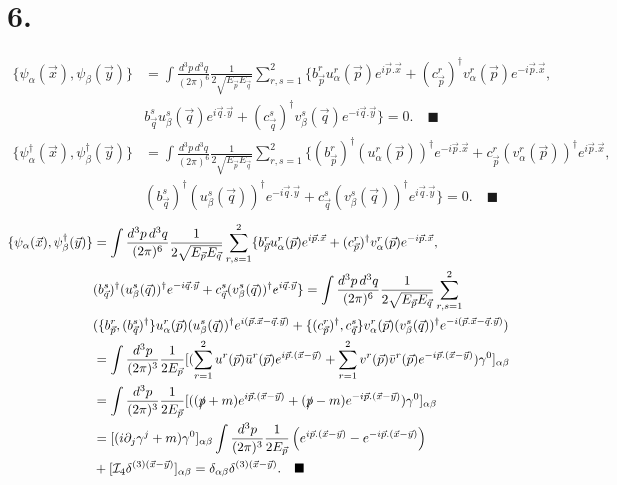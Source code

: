 \documentclass{article}
\newcommand{\pdotx}{\vec{p}.\vec{x}}
\newcommand{\qdoty}{\vec{q}.\vec{y}}
\newcommand{\vecx}{\vec{x}}
\newcommand{\vecy}{\vec{y}}
\newcommand{\vecp}{\vec{p}}
\newcommand{\vecq}{\vec{q}}
\newcommand{\slashp}{\slashed{p}}
\begin{document}
\section*{6.}
\begin{equation}
    \begin{split}
        \{\psi_\alpha(\vecx), \psi_\beta(\vecy) \}&=\int \frac{d^3p\,d^3q}{(2\pi)^6}\frac{1}{2\sqrt{E_{\vecp}E_{\vecq}}}\sum_{r,s=1}^2 \{ b^r_{\vecp}u_\alpha^r(\vecp)e^{i\vecp.\vecx}+(c^r_{\vecp})^\dagger v_\alpha^r(\vecp)e^{-i\vecp.\vecx},\\ & b^s_{\vecq} u_\beta^s(\vecq)e^{i\vecq.\vecy}+ (c^s_{\vecq})^\dagger v^s_\beta(\vecq) e^{-i\vecq.\vecy}\} = 0. \quad \blacksquare
    \end{split}
\end{equation}
\begin{equation}
    \begin{split}
        \{\psi_\alpha^\dagger(\vecx), \psi_\beta^\dagger(\vecy) \}&=\int \frac{d^3p\,d^3q}{(2\pi)^6}\frac{1}{2\sqrt{E_{\vecp}E_{\vecq}}}\sum_{r,s=1}^2 \{ (b^r_{\vecp})^\dagger (u_\alpha^r(\vecp))^\dagger e^{-i\vecp.\vecx}+c^r_{\vecp} (v_\alpha^r(\vecp))^\dagger e^{i\vecp.\vecx},\\ & (b^s_{\vecq})^\dagger (u_\beta^s(\vecq))^\dagger e^{-i\vecq.\vecy}+ c^s_{\vecq} (v^s_\beta(\vecq))^\dagger e^{i\vecq.\vecy}\} = 0. \quad \blacksquare
    \end{split}
\end{equation}
\begin{equation}
    \begin{split}
        \{\psi_\alpha(\vecx), \psi_\beta^\dagger(\vecy) \}&=\int \frac{d^3p\,d^3q}{(2\pi)^6}\frac{1}{2\sqrt{E_{\vecp}E_{\vecq}}}\sum_{r,s=1}^2 \{ b^r_{\vecp} u_\alpha^r(\vecp) e^{i\vecp.\vecx}+(c^r_{\vecp})^\dagger v_\alpha^r(\vecp) e^{-i\vecp.\vecx},\\ & (b^s_{\vecq})^\dagger (u_\beta^s(\vecq))^\dagger e^{-i\vecq.\vecy}+ c^s_{\vecq} (v^s_\beta(\vecq))^\dagger e^{i\vecq.\vecy}\} = \int \frac{d^3p\,d^3q}{(2\pi)^6}\frac{1}{2\sqrt{E_{\vecp}E_{\vecq}}}\sum_{r,s=1}^2 \\ 
        & (  \{b^r_{\vecp},(b^s_{\vecq})^\dagger\}u_\alpha^r(\vecp)(u_\beta^s(\vecq))^\dagger e^{i(\pdotx-\qdoty)} +\{(c^r_{\vecp})^\dagger,c^s_{\vecq} \}v_\alpha^r(\vecp)(v^s_\beta(\vecq))^\dagger e^{-i(\pdotx-\qdoty)}) \\
        & =  \int \frac{d^3p}{(2\pi)^3}\frac{1}{2E_{\vecp}}[(\sum_{r=1}^2u^r(\vecp)\bar{u}^r(\vecp)e^{i\vecp.(\vecx-\vecy)}+\sum_{r=1}^2v^r(\vecp)\bar{v}^r(\vecp)e^{-i\vecp.(\vecx-\vecy)})\gamma^0]_{\alpha\beta}\\
        &=\int \frac{d^3p}{(2\pi)^3}\frac{1}{2E_{\vecp}}[((\slashp+m)e^{i\vecp.(\vecx-\vecy)} + (\slashp -m)e^{-i\vecp.(\vecx-\vecy)})\gamma^0]_{\alpha\beta}\\
        &=[(i\partial_j\gamma^j+m)\gamma^0]_{\alpha\beta}\int \frac{d^3p}{(2\pi)^3}\frac{1}{2E_{\vecp}}\left(e^{i\vecp.(\vecx-\vecy)} -e^{-i\vecp.(\vecx-\vecy)}  \right) \\
        & + [\mathcal{I}_4\delta^{(3)(\vecx-\vecy)}]_{\alpha\beta}=\delta_{\alpha\beta}\delta^{(3)(\vecx-\vecy)}.\quad \blacksquare
    \end{split}
\end{equation}
\end{document}
